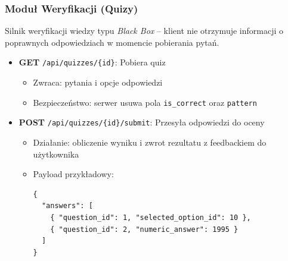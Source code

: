\documentclass[11pt,a4paper]{article}
\numberwithin{equation}{section}
\begin{document}
\subsubsection{Moduł Weryfikacji (Quizy)}
Silnik weryfikacji wiedzy typu \textit{Black Box} – klient nie otrzymuje informacji o poprawnych odpowiedziach w momencie pobierania pytań.
\begin{itemize}
    \item \textbf{GET} \texttt{/api/quizzes/\{id\}}: Pobiera quiz
        \begin{itemize}
            \item Zwraca: pytania i opcje odpowiedzi
            \item Bezpieczeństwo: serwer usuwa pola \texttt{is\_correct} oraz \texttt{pattern}
        \end{itemize}
    \item \textbf{POST} \texttt{/api/quizzes/\{id\}/submit}: Przesyła odpowiedzi do oceny
        \begin{itemize}
            \item Działanie: obliczenie wyniku i zwrot rezultatu z feedbackiem do użytkownika
            \item Payload przykładowy:
            \begin{verbatim}
{
  "answers": [
    { "question_id": 1, "selected_option_id": 10 },
    { "question_id": 2, "numeric_answer": 1995 }
  ]
}
            \end{verbatim}
        \end{itemize}
\end{itemize}
\end{document}
